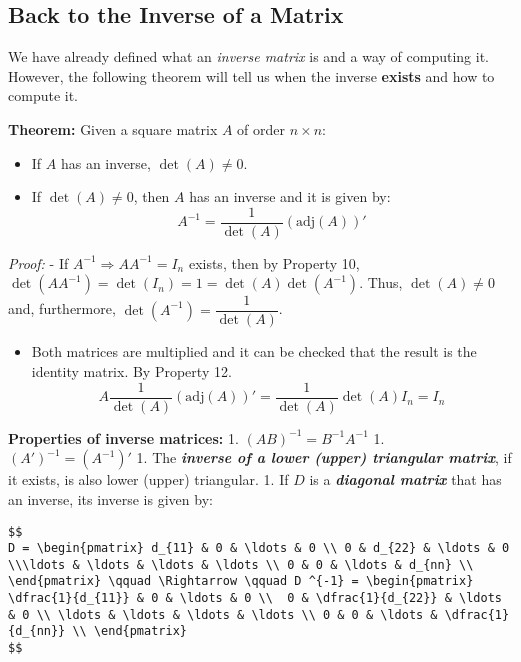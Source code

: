\documentclass[11pt]{article}
\providecommand{\tightlist}{%
      \setlength{\itemsep}{0pt}\setlength{\parskip}{0pt}}
\begin{document}
    \hypertarget{back-to-the-inverse-of-a-matrix}{%
\subsection{Back to the Inverse of a
Matrix}\label{back-to-the-inverse-of-a-matrix}}

We have already defined what an \emph{inverse matrix} is and a way of
computing it. However, the following theorem will tell us when the
inverse \textbf{exists} and how to compute it.

\textbf{Theorem:} Given a square matrix \(A\) of order \(n\times n\):

\begin{itemize}
\item
  If \(A\) has an inverse, \(\det(A) \neq 0\).
\item
  If \(\det(A) \neq 0\), then \(A\) has an inverse and it is given by:
  \[
  A^{-1} = \frac{1}{\det(A)}\left(\text{adj}(A)\right)'
  \]
\end{itemize}

\emph{Proof:} - If \(A^{-1}\Rightarrow AA^{-1} = I_n\) exists, then by
Property 10,
\(\det(AA^{-1}) = \det(I_n) = 1 = \det(A)\det\left(A^{-1}\right)\).
Thus, \(\det(A)\neq 0\) and, furthermore,
\(\det\left(A^{-1}\right) = \dfrac{1}{\det(A)}\).

\begin{itemize}
\tightlist
\item
  Both matrices are multiplied and it can be checked that the result is
  the identity matrix. By Property 12. \[
  A\frac{1}{\det(A)}(\text{adj}(A))' = \frac{1}{\det(A)}\det(A) I_n = I_n
  \]
\end{itemize}

\textbf{Properties of inverse matrices:} 1.
\(\left(AB\right)^{-1} = B^{-1} A^{-1}\) 1.
\(\left(A'\right)^{-1} = \left(A^{-1}\right)'\) 1. The
\textbf{\emph{inverse of a lower (upper) triangular matrix}}, if it
exists, is also lower (upper) triangular. 1. If \(D\) is a
\textbf{\emph{diagonal matrix}} that has an inverse, its inverse is
given by:

\begin{verbatim}
$$
D = \begin{pmatrix} d_{11} & 0 & \ldots & 0 \\ 0 & d_{22} & \ldots & 0 \\\ldots & \ldots & \ldots & \ldots \\ 0 & 0 & \ldots & d_{nn} \\ \end{pmatrix} \qquad \Rightarrow \qquad D ^{-1} = \begin{pmatrix} \dfrac{1}{d_{11}} & 0 & \ldots & 0 \\  0 & \dfrac{1}{d_{22}} & \ldots & 0 \\ \ldots & \ldots & \ldots & \ldots \\ 0 & 0 & \ldots & \dfrac{1}{d_{nn}} \\ \end{pmatrix} 
$$
\end{verbatim}
\end{document}
